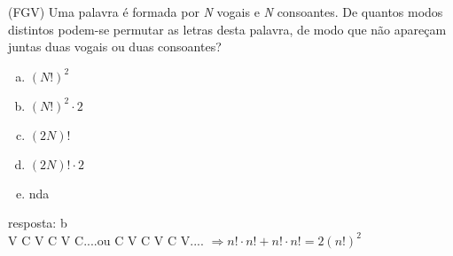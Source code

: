 \begin{ex}
 (FGV) Uma palavra é formada por \textit{N}  vogais e \textit{N} consoantes. De quantos modos distintos podem-se permutar as letras desta palavra, de modo que não apareçam juntas duas vogais ou duas consoantes?
    \begin{enumerate}[(a)]
    \item $(N!)^2$
    \item $(N!)^2\cdot2$
    \item $(2N)!$
    \item $(2N)!\cdot2$
    \item nda
    \end{enumerate}
      \begin{sol}
        resposta: b \\
        V C V C V C....ou C V C V C V....
        $\Longrightarrow n!\cdot n! + n!\cdot n! = 2(n!)^2$
      \end{sol}
\end{ex}